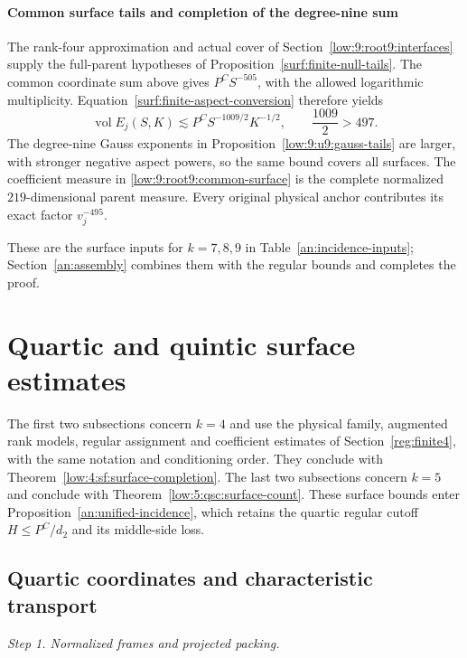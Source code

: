 \documentclass[11pt]{amsart}
\theoremstyle{definition}
\theoremstyle{remark}
\DeclareMathOperator{\vol}{vol}
\numberwithin{equation}{section}
\begin{document}
\paragraph{Common surface tails and completion of the degree-nine sum}
The rank-four approximation and actual cover of Section~\ref{low:9:root9:interfaces} supply the full-parent hypotheses of Proposition~\ref{surf:finite-null-tails}. The common coordinate sum above gives $P^CS^{-505}$, with the allowed logarithmic multiplicity. Equation~\eqref{surf:finite-aspect-conversion} therefore yields
\begin{equation}\label{low:9:root9:common-surface}
\vol E_j(S,K)\lesssim P^CS^{-1009/2}K^{-1/2},\qquad \frac{1009}{2}>497.
\end{equation}
The degree-nine Gauss exponents in Proposition~\ref{low:9:u9:gauss-tails} are larger, with stronger negative aspect powers, so the same bound covers all surfaces. The coefficient measure in \eqref{low:9:root9:common-surface} is the complete normalized $219$-dimensional parent measure. Every original physical anchor contributes its exact factor $v_j^{-495}$. 

These are the surface inputs for $k=7,8,9$ in Table~\ref{an:incidence-inputs}; Section~\ref{an:assembly} combines them with the regular bounds and completes the proof.


\section{Quartic and quintic surface estimates}\label{low:degree45}\label{low:degree4}

The first two subsections concern $k=4$ and use the physical family, augmented rank models, regular assignment and coefficient estimates of Section~\ref{reg:finite4}, with the same notation and conditioning order. They conclude with Theorem~\ref{low:4:sf:surface-completion}. The last two subsections concern $k=5$ and conclude with Theorem~\ref{low:5:qsc:surface-count}. These surface bounds enter Proposition~\ref{an:unified-incidence}, which retains the quartic regular cutoff $H\le P^C/d_2$ and its middle-side loss.

\subsection{Quartic coordinates and characteristic transport}\label{quartic:normalization}\label{low:4:sf:normalization}\label{low:4:sf:sec:packing}\label{low:4:sf:preparation}\label{quartic:coordinates}\label{low:4:sf:sec:gauss}\label{low:4:sf:null}
\par\smallskip\noindent\textit{Step 1. Normalized frames and projected packing.}\par\nobreak\smallskip
\end{document}
